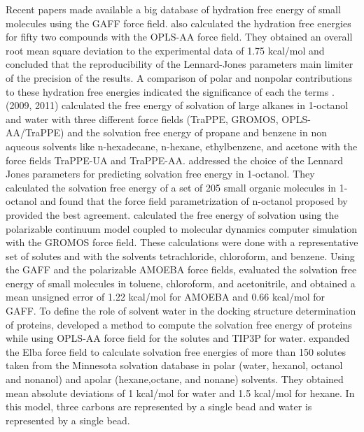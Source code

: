 Recent papers \cite{PMID:24928188,mobley2017} made available a big database of hydration free energy of small molecules using the GAFF force field.  also calculated the hydration free energies for fifty two compounds with the OPLS-AA force field. They obtained an overall root mean square deviation to the experimental data of 1.75 kcal/mol and concluded that the reproducibility of the Lennard-Jones parameters main limiter of the precision of the results. A comparison of polar and nonpolar contributions to these hydration free energies indicated the significance of each the terms  \cite{izairi2017}. \citeauthor{garrido2011} (2009, 2011) calculated the free energy of solvation of large alkanes in 1-octanol and water with three different force fields (TraPPE, GROMOS, OPLS-AA/TraPPE) and the solvation free energy of propane and benzene in non aqueous solvents like n-hexadecane, n-hexane, ethylbenzene, and acetone  with the force fields TraPPE-UA and TraPPE-AA.  addressed the choice of the Lennard Jones parameters for predicting solvation free energy in 1-octanol. They calculated the solvation free energy of a set of 205 small organic molecules in 1-octanol and found that the force field parametrization of n-octanol proposed by  provided the best agreement.  calculated the free energy of solvation using the polarizable continuum model coupled to molecular dynamics computer simulation with the GROMOS force field. These calculations were done with a representative set of solutes and with the solvents tetrachloride, chloroform, and benzene. Using the GAFF and the polarizable AMOEBA force fields,  evaluated the solvation free energy of small molecules in toluene, chloroform, and acetonitrile, and obtained a mean unsigned error of 1.22 kcal/mol for AMOEBA and 0.66 kcal/mol for GAFF. To define the role of solvent water in the docking structure determination of proteins,  developed a method to compute the solvation free energy of proteins while using OPLS-AA force field for the
solutes and TIP3P for water.  expanded the Elba force field to calculate solvation free energies of more than 150 solutes taken from the Minnesota solvation
database in polar (water, hexanol, octanol and nonanol) and apolar (hexane,octane, and nonane) solvents. They obtained mean absolute deviations of 1 kcal/mol for water and 1.5 kcal/mol for hexane. In this model, three carbons are represented by a single bead and water is represented by a single bead. 

